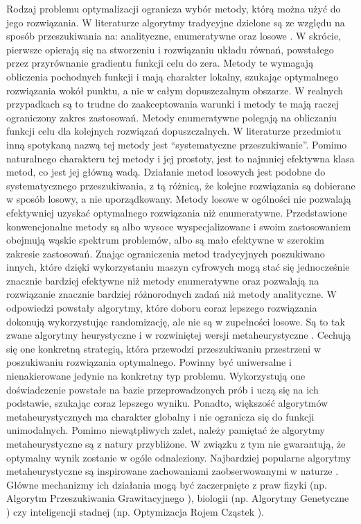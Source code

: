 Rodzaj problemu optymalizacji ogranicza wybór metody, którą można użyć do jego rozwiązania. W literaturze algorytmy tradycyjne dzielone są ze względu na sposób przeszukiwania na: analityczne, enumeratywne oraz losowe \parencite{Goldberg1995}. W skrócie, pierwsze opierają się na stworzeniu i rozwiązaniu układu równań, powstałego przez przyrównanie gradientu funkcji celu do zera. Metody te wymagają obliczenia pochodnych funkcji i mają charakter lokalny, szukając optymalnego rozwiązania wokół punktu, a nie w całym dopuszczalnym obszarze. W realnych przypadkach są to trudne do zaakceptowania warunki i metody te mają raczej ograniczony zakres zastosowań. Metody enumeratywne polegają na obliczaniu funkcji celu dla kolejnych rozwiązań dopuszczalnych. W literaturze przedmiotu inną spotykaną nazwą tej metody jest \enquote{systematyczne przeszukiwanie}. Pomimo naturalnego charakteru tej metody i jej prostoty, jest to najmniej efektywna klasa metod, co jest jej główną wadą. Działanie metod losowych jest podobne do systematycznego przeszukiwania, z tą różnicą, że kolejne rozwiązania są dobierane w sposób losowy, a nie uporządkowany. Metody losowe w ogólności nie pozwalają efektywniej uzyskać optymalnego rozwiązania niż enumeratywne. Przedstawione konwencjonalne metody są albo wysoce wyspecjalizowane i swoim zastosowaniem obejmują wąskie spektrum problemów, albo są mało efektywne w szerokim zakresie zastosowań. Znając ograniczenia metod tradycyjnych poszukiwano innych, które dzięki wykorzystaniu maszyn cyfrowych mogą stać się jednocześnie znacznie bardziej efektywne niż metody enumeratywne oraz pozwalają na rozwiązanie znacznie bardziej różnorodnych zadań niż metody analityczne. W odpowiedzi powstały algorytmy, które doboru coraz lepszego rozwiązania dokonują wykorzystując randomizację, ale nie są w zupełności losowe. Są to tak zwane algorytmy heurystyczne i w rozwiniętej wersji metaheurystyczne \parencite{Blum2003}. Cechują się one konkretną strategią, która przewodzi przeszukiwaniu przestrzeni w poszukiwaniu rozwiązania optymalnego. Powinny być uniwersalne i nienakierowane jedynie na konkretny typ problemu. Wykorzystują one doświadczenie powstałe na bazie przeprowadzonych prób i uczą się na ich podstawie, szukając coraz lepszego wyniku. Ponadto, większość algorytmów metaheurystycznych ma charakter globalny i nie ogranicza się do funkcji unimodalnych. Pomimo niewątpliwych zalet, należy pamiętać że algorytmy metaheurystyczne są z natury przybliżone. W związku z tym nie gwarantują, że optymalny wynik zostanie w ogóle odnaleziony. Najbardziej popularne algorytmy metaheurystyczne są inspirowane zachowaniami zaobserwowanymi w naturze \parencite{FisterJr.2013}. Główne mechanizmy ich działania mogą być zaczerpnięte z praw fizyki (np. Algorytm Przeszukiwania Grawitacyjnego \parencite{Rashedi2009}), biologii (np. Algorytmy Genetyczne \parencite{Goldberg1995}) czy inteligencji stadnej (np. Optymizacja Rojem Cząstek \parencite{Clerc2010,Eberhart2001}).
